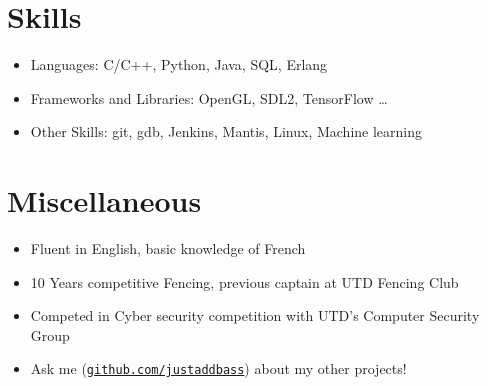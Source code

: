 \documentclass[line,margin]{res}
\begin{document}
\begin{resume}


\vspace{8pt}
\section{Skills}
\vspace{22pt}
	\begin{itemize} \itemsep -2pt
		\item Languages: C/C++, Python, Java, SQL, Erlang
		\item Frameworks and Libraries: OpenGL, SDL2, TensorFlow \ldots
		\item Other Skills: git, gdb, Jenkins, Mantis, Linux, Machine learning
	\end{itemize}

\vspace{8pt}
\section{Miscellaneous}
\vspace{22pt}
	\begin{itemize} \itemsep -2pt
	\item Fluent in English, basic knowledge of French
	\item 10 Years competitive Fencing, previous captain at UTD Fencing Club
	\item Competed in Cyber security competition with UTD's Computer Security Group
	\item Ask me (\href{https://github.com/justaddbass}{\texttt{github.com/justaddbass}}) about my other projects!
	\end{itemize}

\end{resume}
\end{document}
